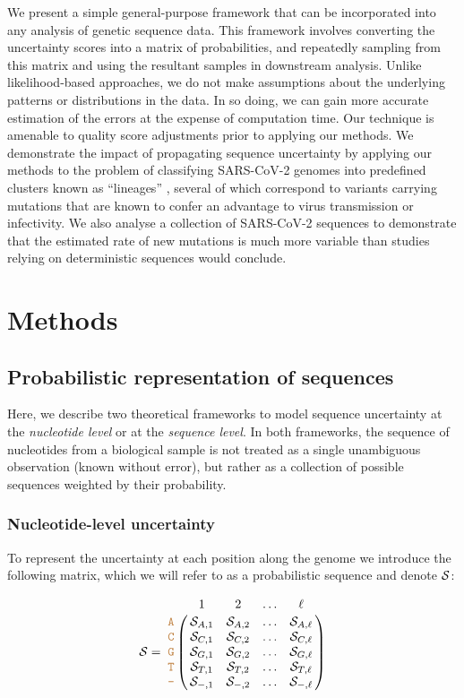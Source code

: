 \documentclass[10pt]{article}
\begin{document}
We present a simple general-purpose framework that can be incorporated into any analysis of genetic sequence data.
This framework involves converting the uncertainty scores into a matrix of probabilities, and repeatedly sampling from this matrix and using the resultant samples in downstream analysis.
Unlike likelihood-based approaches, we do not make assumptions about the underlying patterns or distributions in the data.
In so doing, we can gain more accurate estimation of the errors at the expense of computation time.
Our technique is amenable to quality score adjustments prior to applying our methods.
We demonstrate the impact of propagating sequence uncertainty by applying our methods to the problem of classifying SARS-CoV-2 genomes into predefined clusters known as ``lineages'' \citep{rambautDynamicNomenclatureProposal2020}, several of which correspond to variants carrying mutations that are known to confer an advantage to virus transmission or infectivity.
We also analyse a collection of SARS-CoV-2 sequences to demonstrate that the estimated rate of new mutations is much more variable than studies relying on deterministic sequences would conclude.



\section{Methods}

\subsection{Probabilistic representation of sequences}

Here, we describe two theoretical frameworks to model sequence uncertainty at the \emph{nucleotide level} or at the \emph{sequence level}.
In both frameworks, the sequence of nucleotides from a biological sample is not treated as a single unambiguous observation (known without error), but rather as a collection of possible sequences weighted by their probability.

\subsubsection{Nucleotide-level uncertainty}

To represent the uncertainty at each position along the genome we introduce the following matrix, which we will refer to as a probabilistic sequence and denote $\mathcal{S}$:

\begin{equation}
\nps = \bordermatrix{   & 1 & 2 & \ldots & \ell \cr
                \sq{A} & \nps_{A, 1} & \nps_{A, 2} & \ldots & \nps_{A, \ell} \cr
                \sq{C} & \nps_{C, 1} & \nps_{C, 2} & \ldots & \nps_{C, \ell} \cr
                \sq{G} & \nps_{G, 1} & \nps_{G, 2} & \ldots & \nps_{G, \ell} \cr
                \sq{T} & \nps_{T, 1} & \nps_{T, 2} & \ldots & \nps_{T, \ell} \cr 
                \sq{-} & \nps_{-, 1} & \nps_{-, 2} & \ldots & \nps_{-, \ell} \cr 
}\label{eq:nps}
\end{equation}
\end{document}
